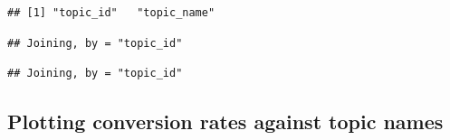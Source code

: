 \documentclass[]{article}
\newenvironment{Shaded}{\begin{snugshade}}{\end{snugshade}}
\newcommand{\DecValTok}[1]{\textcolor[rgb]{0.00,0.00,0.81}{#1}}
\newcommand{\KeywordTok}[1]{\textcolor[rgb]{0.13,0.29,0.53}{\textbf{#1}}}
\newcommand{\NormalTok}[1]{#1}
\newcommand{\OperatorTok}[1]{\textcolor[rgb]{0.81,0.36,0.00}{\textbf{#1}}}
\newcommand{\StringTok}[1]{\textcolor[rgb]{0.31,0.60,0.02}{#1}}
\begin{document}
\begin{verbatim}
## [1] "topic_id"   "topic_name"
\end{verbatim}

\begin{Shaded}
\end{Shaded}

\begin{verbatim}
## Joining, by = "topic_id"
\end{verbatim}

\begin{Shaded}
\end{Shaded}

\begin{verbatim}
## Joining, by = "topic_id"
\end{verbatim}

\hypertarget{plotting-conversion-rates-against-topic-names}{%
\subsection{Plotting conversion rates against topic
names}\label{plotting-conversion-rates-against-topic-names}}
\end{document}
